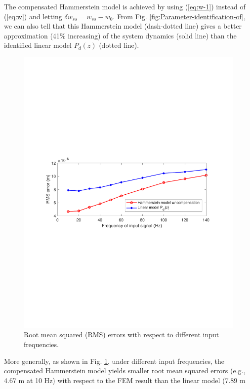 \documentclass [11pt, proquest] {uwthesis}[2020/02/24]
\begin{document}
The compensated Hammerstein model is achieved by using (\ref{eq:w-1})
instead of (\ref{eq:w}) and letting $\delta w_{ss}=w_{ss}-w_{0}$.
From Fig. \ref{fig:Parameter-identification-of}, we can also tell
that this Hammerstein model (dash-dotted line) gives a better approximation
(41\% increasing) of the system dynamics (solid line) than the identified
linear model $P_{d}(z)$ (dotted line). 
\begin{figure}[!ht]
\begin{centering}
\includegraphics[clip,width=13cm]{Hammerstein/RMS_error_All_freq}
\par\end{centering}
\centering{}\caption{\label{fig:Root-mean-squared}Root mean squared (RMS) errors with
respect to different input frequencies.}
\end{figure}
More generally, as shown in Fig. \ref{fig:Root-mean-squared}, under
different input frequencies, the compensated Hammerstein model yields
smaller root mean squared errors (e.g., 4.67 \textmu m at 10 Hz)
with respect to the FEM result than the linear model (7.89 \textmu m
\end{document}
